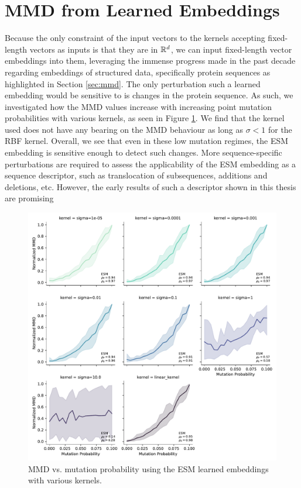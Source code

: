 \section{MMD from Learned Embeddings}

Because the only constraint of the input vectors to the kernels accepting
fixed-length vectors as inputs is that they are in $\mathbb{R}^d$, we can input
fixed-length vector embeddings into them, leveraging the immense progress made
in the past decade regarding embeddings of structured data, specifically protein
sequences as highlighted in Section \ref{sec:mmd}. The only perturbation such a
learned embedding would be sensitive to is changes in the protein sequence. As
such, we investigated how the MMD values increase with increasing point mutation
probabilities with various kernels, as seen in Figure \ref{fig:esm_descriptor}.
We find that the kernel used does not have any bearing on the MMD behaviour as
long as $\sigma<1$ for the RBF kernel. Overall, we see that even in these low
mutation regimes, the ESM embedding is sensitive enough to detect such changes.
More sequence-specific perturbations are required to assess the
applicability of the ESM embedding as a sequence descriptor, such as
translocation of subsequences, additions and deletions, etc. However, the early
results of such a descriptor shown in this thesis are promising

\begin{figure}
  \centering
  \includegraphics[width=\textwidth]{./figures/results/res_5.pdf}
  \caption[MMD vs. mutation probability using the ESM learned embeddings with
  various kernels ]{MMD vs. mutation probability using the ESM learned embeddings with various kernels.}
  \label{fig:esm_descriptor}
\end{figure}


